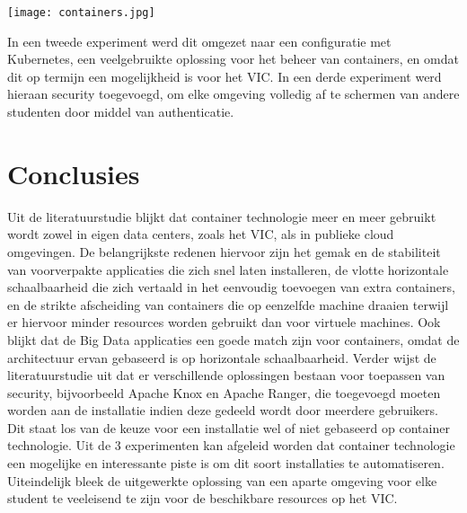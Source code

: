 \documentclass[a0,portrait]{hogent-poster}
\begin{document}
\begin{multicols}{2}
\begin{center}
  \captionsetup{type=figure}
  \texttt{[image: containers.jpg]}
\end{center}

\noindent In een tweede experiment werd dit omgezet naar een configuratie met Kubernetes, een veelgebruikte oplossing voor het beheer van containers, en omdat dit op termijn een mogelijkheid is voor het VIC.
\newline
\newline
In een derde experiment werd hieraan security toegevoegd, om elke omgeving volledig af te schermen van andere studenten door middel van authenticatie.
\newline
\newline


\section{Conclusies}
Uit de literatuurstudie blijkt dat container technologie meer en meer gebruikt wordt zowel in eigen data centers, zoals het VIC, als in publieke cloud omgevingen. De belangrijkste redenen hiervoor zijn het gemak en de stabiliteit van voorverpakte applicaties die zich snel laten installeren, de vlotte horizontale schaalbaarheid die zich vertaald in het eenvoudig toevoegen van extra containers, en de strikte afscheiding van containers die op eenzelfde machine draaien terwijl er hiervoor minder resources worden gebruikt dan voor virtuele machines.
\newline
\newline
Ook blijkt dat de Big Data applicaties een goede match zijn voor containers, omdat de architectuur ervan gebaseerd is op horizontale schaalbaarheid. Verder wijst de literatuurstudie uit dat er verschillende oplossingen bestaan voor toepassen van security, bijvoorbeeld Apache Knox en Apache Ranger, die toegevoegd moeten worden aan de installatie indien deze gedeeld wordt door meerdere gebruikers. Dit staat los van de keuze voor een installatie wel of niet gebaseerd op container technologie.
\newline
\newline
Uit de 3 experimenten kan afgeleid worden dat container technologie een mogelijke en interessante piste is om dit soort installaties te automatiseren. Uiteindelijk bleek de uitgewerkte oplossing van een aparte omgeving voor elke student te veeleisend te zijn voor de beschikbare resources op het VIC.
\newline
\newline



\end{multicols}
\end{document}
